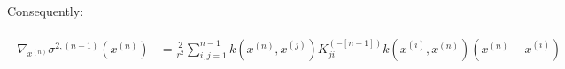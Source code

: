 \documentclass[paper=a4, fontsize=11pt]{scrartcl} %
\numberwithin{equation}{section} %
\numberwithin{figure}{section} %
\numberwithin{table}{section} %
\newcommand{\gxn}{\nabla_{x^{(n)}}} %
\newcommand{\xn}{x^{(n)}} %
\newcommand{\xj}{x^{(j)}}
\newcommand{\xii}{x^{(i)}}
\newcommand{\Kinvnm}{K^{(-[n-1])}}
\newcommand{\signxn}{\sigma^{2, (n-1)} (\xn)}
\begin{document}
Consequently:

\begin{align}
 \begin{split}
  \gxn \signxn &= \frac{2}{r^2} \sum_{i,j=1}^{n-1} k(\xn,\xj) \Kinvnm_{ji} k(\xii ,\xn) (\xn-\xii)\\\\
 \end{split}
\end{align}
\end{document}
